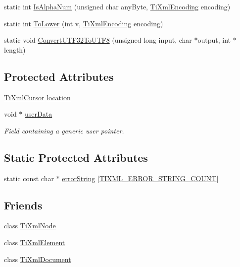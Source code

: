 \begin{DoxyCompactItemize}
\item 
static int \hyperlink{class_ti_xml_base_a321919055c115c78ded17f85a793f368}{Is\+Alpha\+Num} (unsigned char any\+Byte, \hyperlink{tinyxml_8h_a88d51847a13ee0f4b4d320d03d2c4d96}{Ti\+Xml\+Encoding} encoding)
\item 
static int \hyperlink{class_ti_xml_base_a799f17405a86a5c2029618e85f11a097}{To\+Lower} (int v, \hyperlink{tinyxml_8h_a88d51847a13ee0f4b4d320d03d2c4d96}{Ti\+Xml\+Encoding} encoding)
\item 
static void \hyperlink{class_ti_xml_base_a07c765e3a7f979d343e646ea797b180b}{Convert\+U\+T\+F32\+To\+U\+T\+F8} (unsigned long input, char $\ast$output, int $\ast$length)
\end{DoxyCompactItemize}
\subsection*{Protected Attributes}
\begin{DoxyCompactItemize}
\item 
\hyperlink{struct_ti_xml_cursor}{Ti\+Xml\+Cursor} \hyperlink{class_ti_xml_base_a0d992580f3bc264909f898e942677a3c}{location}
\item 
void $\ast$ \hyperlink{class_ti_xml_base_ab242c01590191f644569fa89a080d97c}{user\+Data}
\begin{DoxyCompactList}\small\item\em Field containing a generic user pointer. \end{DoxyCompactList}\end{DoxyCompactItemize}
\subsection*{Static Protected Attributes}
\begin{DoxyCompactItemize}
\item 
static const char $\ast$ \hyperlink{class_ti_xml_base_a7ac8feec4100e446b3d78e1ac0659700}{error\+String} \mbox{[}\hyperlink{class_ti_xml_base_a6a1007a163c33d207abfbd8750c9299da14552894942250efcec6b00dc52fc48a}{T\+I\+X\+M\+L\+\_\+\+E\+R\+R\+O\+R\+\_\+\+S\+T\+R\+I\+N\+G\+\_\+\+C\+O\+U\+N\+T}\mbox{]}
\end{DoxyCompactItemize}
\subsection*{Friends}
\begin{DoxyCompactItemize}
\item 
class \hyperlink{class_ti_xml_base_a218872a0d985ae30e78c55adc4bdb196}{Ti\+Xml\+Node}
\item 
class \hyperlink{class_ti_xml_base_ab6592e32cb9132be517cc12a70564c4b}{Ti\+Xml\+Element}
\item 
class \hyperlink{class_ti_xml_base_a173617f6dfe902cf484ce5552b950475}{Ti\+Xml\+Document}
\end{DoxyCompactItemize}


